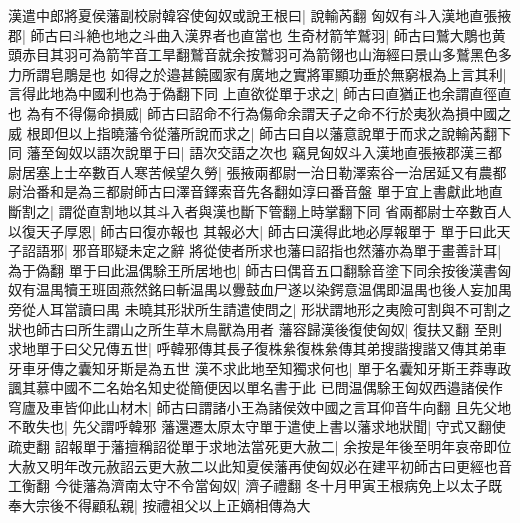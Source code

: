 漢遣中郎將夏侯藩副校尉韓容使匈奴或說王根曰|{
	說輸芮翻}
匈奴有斗入漢地直張掖郡|{
	師古曰斗絶也地之斗曲入漢界者也直當也}
生奇材箭竿鷲羽|{
	師古曰鷲大鵰也黄頭赤目其羽可為箭竿音工旱翻鷲音就余按鷲羽可為箭翎也山海經曰景山多鷲黑色多力所謂皂鵰是也}
如得之於邉甚饒國家有廣地之實將軍顯功垂於無窮根為上言其利|{
	言得此地為中國利也為于偽翻下同}
上直欲從單于求之|{
	師古曰直猶正也余謂直徑直也}
為有不得傷命損威|{
	師古曰詔命不行為傷命余謂天子之命不行於夷狄為損中國之威}
根即但以上指曉藩令從藩所說而求之|{
	師古曰自以藩意說單于而求之說輸芮翻下同}
藩至匈奴以語次說單于曰|{
	語次交語之次也}
竊見匈奴斗入漢地直張掖郡漢三都尉居塞上士卒數百人寒苦候望久勞|{
	張掖兩都尉一治日勒澤索谷一治居延又有農都尉治番和是為三都尉師古曰澤音鐸索音先各翻如淳曰番音盤}
單于宜上書獻此地直斷割之|{
	謂從直割地以其斗入者與漢也斷下管翻上時掌翻下同}
省兩都尉士卒數百人以復天子厚恩|{
	師古曰復亦報也}
其報必大|{
	師古曰漢得此地必厚報單于}
單于曰此天子詔語邪|{
	邪音耶疑未定之辭}
將從使者所求也藩曰詔指也然藩亦為單于畫善計耳|{
	為于偽翻}
單于曰此温偶駼王所居地也|{
	師古曰偶音五口翻駼音塗下同余按後漢書匈奴有温禺犢王班固燕然銘曰斬温禺以釁鼓血尸遂以染鍔意温偶即温禺也後人妄加禺旁從人耳當讀曰禺}
未曉其形狀所生請遣使問之|{
	形狀謂地形之夷險可割與不可割之狀也師古曰所生謂山之所生草木鳥獸為用者}
藩容歸漢後復使匈奴|{
	復扶又翻}
至則求地單于曰父兄傳五世|{
	呼韓邪傳其長子復株絫復株絫傳其弟搜諧搜諧又傳其弟車牙車牙傳之囊知牙斯是為五世}
漢不求此地至知獨求何也|{
	單于名囊知牙斯王莽專政諷其慕中國不二名始名知史從簡便因以單名書于此}
已問温偶駼王匈奴西邉諸侯作穹廬及車皆仰此山材木|{
	師古曰謂諸小王為諸侯效中國之言耳仰音牛向翻}
且先父地不敢失也|{
	先父謂呼韓邪}
藩還遷太原太守單于遣使上書以藩求地狀聞|{
	守式又翻使疏吏翻}
詔報單于藩擅稱詔從單于求地法當死更大赦二|{
	余按是年後至明年哀帝即位大赦又明年改元赦詔云更大赦二以此知夏侯藩再使匈奴必在建平初師古曰更經也音工衡翻}
今徙藩為濟南太守不令當匈奴|{
	濟子禮翻}
冬十月甲寅王根病免上以太子既奉大宗後不得顧私親|{
	按禮祖父以上正嫡相傳為大}


